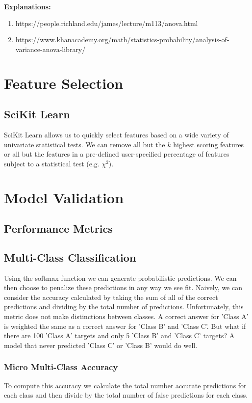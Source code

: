 \documentclass{article}
\begin{document}
\vspace{3mm}
\textbf{Explanations:}
\begin{enumerate}
\item https://people.richland.edu/james/lecture/m113/anova.html
\item https://www.khanacademy.org/math/statistics-probability/analysis-of-variance-anova-library/
\end{enumerate}

\section{Feature Selection}
\subsection{SciKit Learn}
SciKit Learn allows us to quickly select features based on a wide variety of univariate statistical tests. We can remove all but the $k$ highest scoring features or all but the features in a pre-defined user-specified percentage of features subject to a statistical test (e.g. $\chi^2$). 


\section{Model Validation}
\subsection{Performance Metrics}

\subsection{Multi-Class Classification}
Using the softmax function we can generate probabilistic predictions. We can then choose to penalize these predictions in any way we see fit. Naively, we can consider the accuracy calculated by taking the sum of all of the correct predictions and dividing by the total number of predictions. Unfortunately, this metric does not make distinctions between classes. A correct answer for 'Class A' is weighted the same as a correct answer for 'Class B' and 'Class C'. But what if there are 100 'Class A' targets and only 5 'Class B' and 'Class C' targets? A model that never predicted 'Class C' or 'Class B' would do well. 

\subsubsection{Micro Multi-Class Accuracy}
To compute this accuracy we calculate the total number accurate predictions for each class and then divide by the total number of false predictions for each class. 
\end{document}
